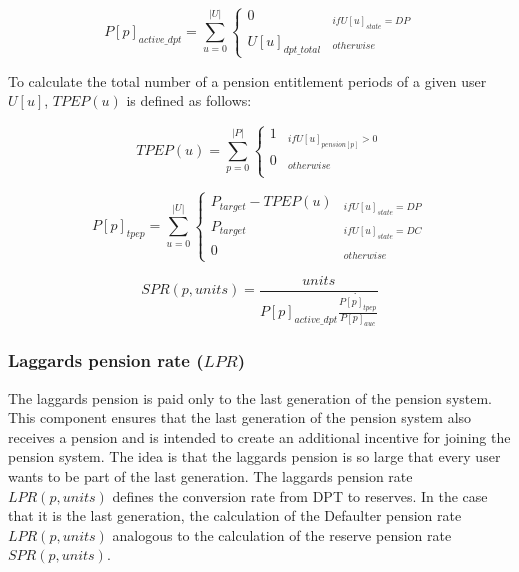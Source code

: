 \begin{equation}
P[p]_{active\_dpt} = \sum_{u=0}^{|U|} \begin{cases} 
0 & _{if U[u]_{state} = DP}\\
U[u]_{dpt\_total} & _{otherwise}
\end{cases}
\end{equation}

To calculate the total number of a pension entitlement periods of a given user $U[u]$, $TPEP(u)$ is defined as follows:

\begin{equation}
TPEP(u) = \sum_{p=0}^{|P|} \begin{cases}
1 & _{if U[u]_{pension[p]} > 0}\\
0 & _{otherwise}\\
\end{cases}
\end{equation}



\begin{equation}
P[p]_{tpep} = \sum_{u=0}^{|U|} \begin{cases}
P_{target} - TPEP(u)  & _{if U[u]_{state} = DP}\\
P_{target} & _{if U[u]_{state} = DC}\\
0 & _{otherwise}
\end{cases}
\end{equation}

\begin{equation}
SPR(p, units) = \frac{units} {P[p]_{active\_dpt} \dot {\frac{P[p]_{tpep}} {P[p]_{auc}}}
}
\end{equation}


\subsubsection{Laggards pension rate ($LPR$)}

The laggards pension is paid only to the last generation of the pension system. This component ensures that the last generation of the pension system also receives a pension and is intended to create an additional incentive for joining the pension system. The idea is that the laggards pension is so large that every user wants to be part of the last generation. 
The laggards pension rate $LPR(p, units)$ defines the conversion rate from DPT to reserves. 
In the case that it is the last generation, the calculation of the  Defaulter pension rate $LPR(p, units)$ analogous to the calculation of the reserve pension rate $SPR(p, units)$.

